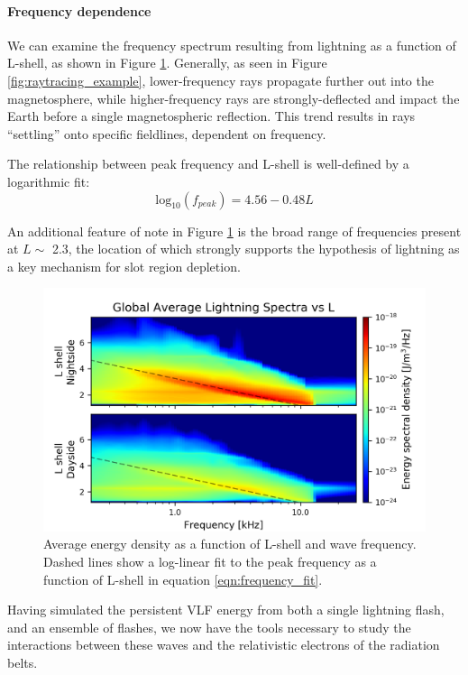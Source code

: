 \paragraph{Frequency dependence}
We can examine the frequency spectrum resulting from lightning as a function of L-shell, as shown in Figure \ref{fig:energy_density_vs_L_vs_freq}. Generally, as seen in Figure \ref{fig:raytracing_example}, lower-frequency rays propagate further out into the magnetosphere, while higher-frequency rays are strongly-deflected and impact the Earth before a single magnetospheric reflection. This trend results in rays ``settling'' onto specific fieldlines, dependent on frequency.

The relationship between peak frequency and L-shell is well-defined by a logarithmic fit:
\begin{equation}
\label{eqn:frequency_fit}
\mathrm{log}_{10}(f_{peak}) = 4.56 - 0.48 L
\end{equation}

An additional feature of note in Figure \ref{fig:energy_density_vs_L_vs_freq} is the broad range of frequencies present at $L \sim$ 2.3, the location of which strongly supports the hypothesis of lightning as a key mechanism for slot region depletion. 
\begin{figure}[hb]
\begin{center}
\includegraphics{figures/lightning_spectra_vs_L_logscale.png}
\caption[Average energy density vs L and frequency]{Average energy density as a function of L-shell and wave frequency. Dashed lines show a log-linear fit to the peak frequency as a function of L-shell in equation \eqref{eqn:frequency_fit}.}
\label{fig:energy_density_vs_L_vs_freq}
\end{center}
\end{figure}

Having simulated the persistent VLF energy from both a single lightning flash, and an ensemble of flashes, we now have the tools necessary to study the interactions between these waves and the relativistic electrons of the radiation belts.








